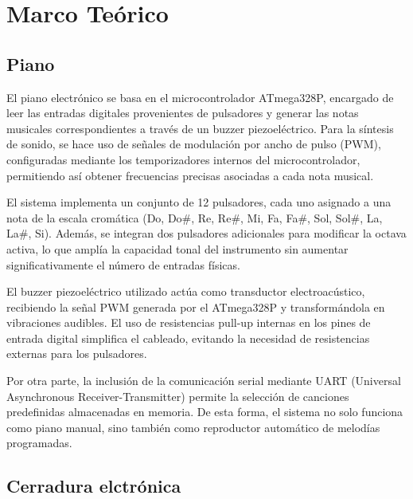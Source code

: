 \section{Marco Teórico}

\subsection{Piano}
El piano electrónico se basa en el microcontrolador ATmega328P, encargado de leer las entradas digitales provenientes de pulsadores y generar las notas musicales correspondientes a través de un buzzer piezoeléctrico. Para la síntesis de sonido, se hace uso de señales de modulación por ancho de pulso (PWM), configuradas mediante los temporizadores internos del microcontrolador, permitiendo así obtener frecuencias precisas asociadas a cada nota musical.

El sistema implementa un conjunto de 12 pulsadores, cada uno asignado a una nota de la escala cromática (Do, Do\#, Re, Re\#, Mi, Fa, Fa\#, Sol, Sol\#, La, La\#, Si). Además, se integran dos pulsadores adicionales para modificar la octava activa, lo que amplía la capacidad tonal del instrumento sin aumentar significativamente el número de entradas físicas.

El buzzer piezoeléctrico utilizado actúa como transductor electroacústico, recibiendo la señal PWM generada por el ATmega328P y transformándola en vibraciones audibles. El uso de resistencias pull-up internas en los pines de entrada digital simplifica el cableado, evitando la necesidad de resistencias externas para los pulsadores.

Por otra parte, la inclusión de la comunicación serial mediante UART (Universal Asynchronous Receiver-Transmitter) permite la selección de canciones predefinidas almacenadas en memoria. De esta forma, el sistema no solo funciona como piano manual, sino también como reproductor automático de melodías programadas.

\subsection{Cerradura elctrónica}

